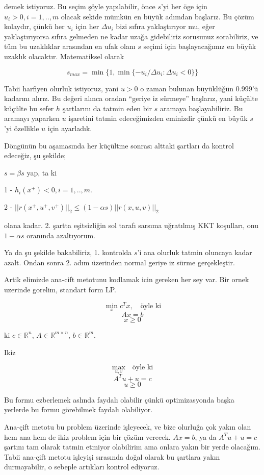 \documentclass[12pt,fleqn]{article}\usepackage{../../common}
\begin{document}
demek istiyoruz. Bu seçim şöyle yapılabilir, önce $s$'yi her öge için
$u_i > 0, i=1,..,m$ olacak sekide mümkün en büyük adımdan başlarız. Bu
çözüm kolaydır, çünkü her $u_i$ için her $\Delta u_i$ bizi sıfıra
yaklaştırıyor mu, eğer yaklaştırıyorsa sıfıra gelmeden ne kadar uzağa
gidebiliriz sorusunuz sorabiliriz, ve tüm bu uzaklıklar arasından en ufak
olanı $s$ seçimi için başlayacağımız en büyük uzaklık
olacaktır. Matematiksel olarak 

$$
s_{max} = \min \bigg\{
  1, \min \{ -u_i / \Delta u_i : \Delta u_i < 0  \}
\bigg\}
$$

Tabii harfiyen olurluk istiyoruz, yani $u > 0$ o zaman bulunan büyüklüğün
0.999'ü kadarını alırız. Bu değeri alınca oradan ``geriye iz sürmeye''
başlarız, yani küçülte küçülte bu sefer $h$ şartlarını da tatmin eden bir
$s$ aramaya başlayabiliriz. Bu aramayı yaparken $u$ işaretini tatmin
edeceğimizden eminizdir çünkü en büyük $s$'yi özellikle $u$ için ayarladık.

Döngünün bu aşamasında her küçültme sonrası alttaki şartları da kontrol
edeceğiz, şu şekilde;

$s = \beta s$ yap, ta ki 

1 - $h_i(x^+) < 0, i=1,..,m$. 

2 - $|| r(x^+, u^+, v^+) ||_2 \le (1-\alpha s) || r(x,u,v) ||_2$

olana kadar. 2. şartta eşitsizliğin sol tarafı sarsıma uğratılmış KKT
koşulları, onu $1-\alpha s$ oranında azaltıyorum.

Ya da şu şekilde bakabiliriz, 1. kontrolda $s$'i ana olurluk tatmin
oluncaya kadar azalt. Ondan sonra 2. adım üzerinden normal geriye iz sürme
gerçekleştir. 

Artik elimizde ana-cift metotunu kodlamak icin gereken her sey var. Bir
ornek uzerinde gorelim, standart form LP. 

$$
\min_x c^T x, \quad \textrm{öyle ki}
$$
$$
Ax = b
$$
$$
x \ge 0
$$

ki $c \in \mathbb{R}^n$, $A \in \mathbb{R}^{m \times n}$, $b \in \mathbb{R}^m$.

Ikiz

$$
\max_{u,v} \quad \textrm{öyle ki}
$$
$$
A^T u + u = c
$$
$$
u \ge 0
$$

Bu formu ezberlemek aslında faydalı olabilir çünkü optimizasyonda başka
yerlerde bu formu görebilmek faydalı olabiliyor. 

Ana-çift metotu bu problem üzerinde işleyecek, ve bize olurluğa çok yakın
olan hem ana hem de ikiz problem için bir çözüm verecek. $Ax=b$, ya da
$A^T u + u = c$ şartını tam olarak tatmin etmiyor olabilirim ama onlara
yakın bir yerde olacağım. Tabii ana-çift metotu işleyişi sırasında doğal
olarak bu şartlara yakın durmayabilir, o sebeple artıkları kontrol
ediyoruz. 
\end{document}
